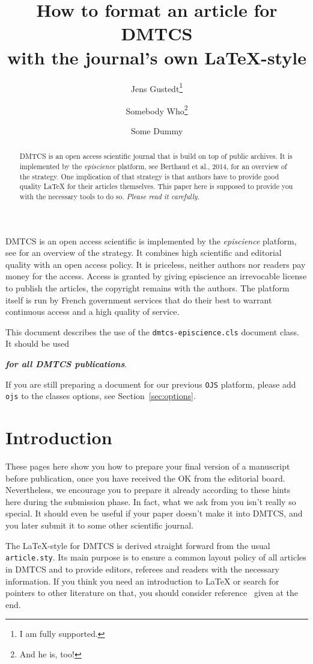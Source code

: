 \documentclass[
submission
]{dmtcs-episciences}
\author{Jens Gustedt\affiliationmark{1,2}\thanks{I am fully supported.}
  \and Somebody Who\affiliationmark{3}\thanks{And he is, too!}
  \and Some Dummy\affiliationmark{3}}
\title[Formatting an article for DMTCS]{How to format an article
  for DMTCS\\
  with the journal's own \LaTeX-style}
\affiliation{
  INRIA, France\\
  ICube, university of Strasbourg, France\\
  Alma Mater, campus universalis, terra incognita}
\begin{document}
\maketitle
\begin{abstract}
  DMTCS is an open access scientific journal that is build on top of
  public archives. It is implemented by the \emph{episcience}
  platform, see Berthaud et al., 2014, for an overview of the
  strategy. One implication of that strategy is that authors have to
  provide good quality \LaTeX{} for their articles themselves. This
  paper here is supposed to provide you with the necessary tools to do
  so. \emph{Please read it carefully.}
\end{abstract}

DMTCS is an open access scientific is implemented by the
\emph{episcience} platform, see \cite{berthaud:hal-01002815} for an
overview of the strategy. It combines high scientific and editorial
quality with an open access policy. It is priceless, neither authors
nor readers pay money for the access. Access is granted by giving
episcience an irrevocable license to publish the articles, the
copyright remains with the authors. The platform itself is run by
French government services that do their best to warrant continuous
access and a high quality of service.

This document describes the use of the \texttt{dmtcs-episcience.cls}
document class. It should be used
\begin{center}
  \emph{\textbf{for all DMTCS publications}}.
\end{center}

If you are still preparing a document for our previous \texttt{OJS}
platform, please add \texttt{ojs} to the classes options, see
Section~\ref{sec:options}.

\section{Introduction}
\label{sec:in}
These pages here show you how to prepare your final version of a
manuscript before publication, once you have received the OK from the
editorial board. Nevertheless, we encourage you to prepare it already
according to these hints here during the submission phase. In fact,
what we ask from you isn't really so special. It should even be useful
if your paper doesn't make it into DMTCS, and you later submit it to
some other scientific journal.

The \LaTeX-style for DMTCS is derived straight forward from the
usual \texttt{article.sty}. Its main purpose is to ensure a common
layout policy of all articles in DMTCS and to provide editors,
referees and readers with the necessary information. If you think you
need an introduction to \LaTeX{} or search for pointers to other
literature on that, you should consider
reference~\cite{oetiker99:_not_so_short_introd_latex} given at the
end.
\end{document}

